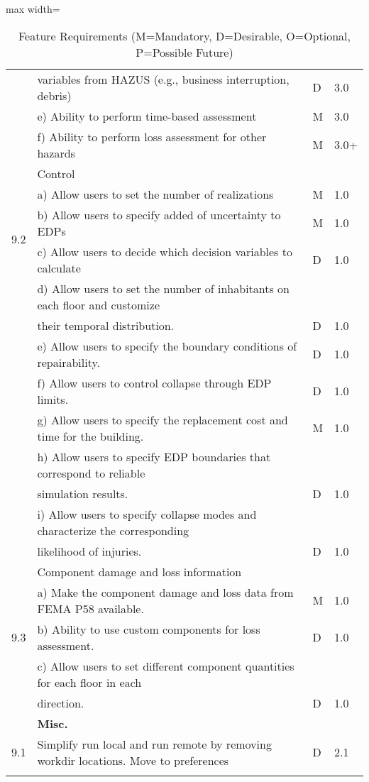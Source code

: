 \begin{table}[hbt!]
\begin{adjustbox}{max width=\textwidth}
\begin{tabular}{llll}
{     & \hspace{1em} variables from HAZUS (e.g., business interruption, debris) & D & 3.0 \\
     & e) Ability to perform time-based assessment & M & 3.0 \\
     & f) Ability to perform loss assessment for other hazards & M & 3.0+ \\ \hline
    \multirow{5}{*}{9.2} & Control & & \\
     & a) Allow users to set the number of realizations & M & 1.0\\
     & b) Allow users to specify added of uncertainty to EDPs & M & 1.0 \\
     & c) Allow users to decide which decision variables to calculate & D & 1.0 \\
     & d) Allow users to set the number of inhabitants on each floor and customize &&\\
     & \hspace{1em} their temporal distribution. & D & 1.0 \\
     & e) Allow users to specify the boundary conditions of repairability. & D & 1.0 \\
     & f) Allow users to control collapse through EDP limits. & D & 1.0\\
     & g) Allow users to specify the replacement cost and time for the building. & M & 1.0 \\
     & h) Allow users to specify EDP boundaries that correspond to reliable &&\\
     & \hspace{1em} simulation results. & D & 1.0\\
     & i) Allow users to specify collapse modes and characterize the corresponding &&\\
     & \hspace{1em} likelihood of injuries. & D & 1.0\\ \hline
	\multirow{5}{*}{9.3} & Component damage and loss information & & \\
	 & a) Make the component damage and loss data from FEMA P58 available. & M & 1.0 \\
	 & b) Ability to use custom components for loss assessment. & D & 1.0 \\
	 & c) Allow users to set different component quantities for each floor in each &&\\
	 & \hspace{1em} direction. & D & 1.0 \\
}{
    9 & \textbf{Misc.} &  &  \\ \hline
	9.1 & Simplify run local and run remote by removing workdir locations. Move to preferences & D & 2.1  \\ \hline
}
      \bottomrule                                  
  \end{tabular}
\end{adjustbox}
  \caption{Feature Requirements (M=Mandatory, D=Desirable, O=Optional, P=Possible Future)}             
  \label{tab:featureRequirements_2}                 
\end{table}

